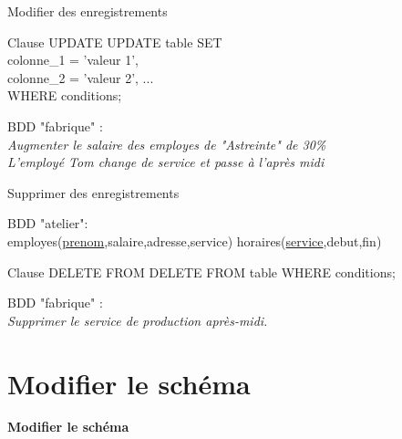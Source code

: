 \documentclass[xetex,dvipsnames]{beamer}
\begin{document}
\begin{frame}{Modifier des enregistrements}

	\begin{alertblock}{Clause UPDATE}
		UPDATE table SET \\colonne\_1 = 'valeur 1', \\colonne\_2 = 'valeur 2', ... \\WHERE conditions;
	\end{alertblock}
	
\begin{scriptsize}
	\vspace{1em}
	BDD "fabrique" :\\
	\vspace{0.5em}
	\textit{Augmenter le salaire des employes de "Astreinte" de 30\%}\\
	\textit{L'employé Tom change de service et passe à l'après midi }\\
\end{scriptsize}
\end{frame}

\begin{frame}{Supprimer des enregistrements}
	\begin{small}
		BDD "atelier": \\employes(\underline{prenom},salaire,adresse,service) horaires(\underline{service},debut,fin)
	\end{small}	
	\begin{alertblock}{Clause DELETE FROM}
		DELETE FROM table WHERE conditions;
	\end{alertblock}
\begin{scriptsize}
	\vspace{1em}
	BDD "fabrique" :\\
	\vspace{0.5em}
	\textit{Supprimer le service de production après-midi.}\\
\end{scriptsize}

\end{frame}

\section{Modifier le schéma}
\begin{frame}
\begin{center}
{\LARGE \textbf{Modifier le schéma}}
\end{center}
\end{frame}
\end{document}
